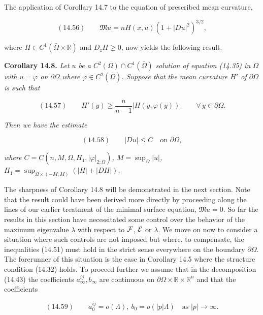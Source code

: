 \medskip

\noindent The application of Corollary 14.7 to the equation of prescribed mean
curvature,

\[
(14.56)\qquad \mathfrak M u = nH(x,u)(1+|Du|^2)^{3/2},
\]

\noindent where $H \in C^1(\bar{\Omega} \times \mathbb R)$ and $D_z H \ge 0$, now
yields the following result.

\medskip

\begin{corollary}\label{gt14-boundary-gradient-14-8}
\noindent\textbf{Corollary 14.8.} \textit{Let $u$ be a $C^2(\Omega) \cap C^1(\bar{\Omega})$
solution of equation (14.35) in $\Omega$ with $u = \varphi$ on $\partial\Omega$
where $\varphi \in C^2(\bar{\Omega})$. Suppose that the mean curvature $H'$ of
$\partial\Omega$ is such that}

\[
(14.57)\qquad H'(y) \ge \frac{n}{n-1}|H(y,\varphi(y))| \qquad \forall\, y \in \partial\Omega.
\]

\noindent\textit{Then we have the estimate}

\[
(14.58)\qquad |Du| \le C \quad \text{on } \partial\Omega,
\]

\noindent\textit{where $C = C(n, M, \Omega, H_1, |\varphi|_{2;\Omega})$, $M = \sup_{\Omega}|u|$,
$H_1 = \sup_{\Omega \times (-M,M)} (|H| + |DH|)$.}
\end{corollary}

\medskip

The sharpness of Corollary 14.8 will be demonstrated in the next section. Note
that the result could have been derived more directly by proceeding along the
lines of our earlier treatment of the minimal surface equation, $\mathfrak M u = 0$.
So far the results in this section have necessitated some control over the
behavior of the maximum eigenvalue $\lambda$ with respect to $\mathcal{F}$, $\mathcal{E}$ or
$\lambda$. We move on now to consider a situation where such controls are not
imposed but where, to compensate, the inequalities (14.51) must hold in the
strict sense everywhere on the boundary $\partial\Omega$. The forerunner of this
situation is the case in Corollary 14.5 where the structure condition (14.32)
holds. To proceed further we assume that in the decomposition (14.43) the
coefficients $a^{ij}_\infty, b_\infty$ are continuous on $\partial\Omega \times
\mathbb R \times \mathbb R^n$ and that the coefficients

\[
(14.59)\qquad a^{ij}_0 = o(\Lambda),\ b_0 = o(|p|\Lambda)\quad \text{as } |p| \to \infty.
\]

